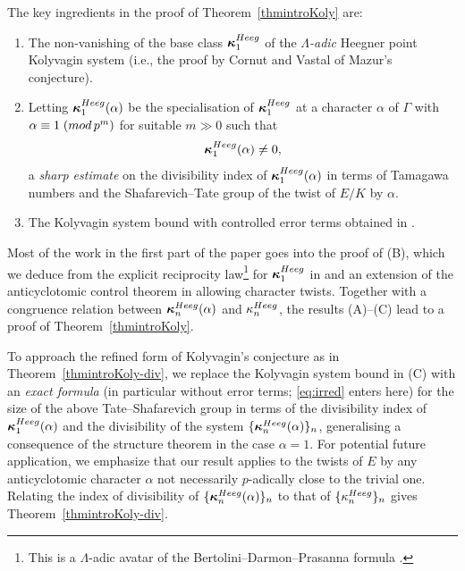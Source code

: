 \documentclass[10pt,reqno]{amsart}
\numberwithin{equation}{section}
\theoremstyle{plain}
\theoremstyle{definition}
\theoremstyle{definition}
\theoremstyle{plain}
\theoremstyle{plain}
\theoremstyle{plain}
\theoremstyle{plain}
\theoremstyle{plain}
\theoremstyle{plain}
\newcommand{\bkappa}{\boldsymbol{\kappa}}
\begin{document}
The key ingredients in the proof of Theorem~\ref{thmintroKoly} are:
\begin{enumerate}
\item[(A)] The non-vanishing of the base class $\bkappa_1^{\rm Heeg}$ of the \emph{$\Lambda$-adic} Heegner point Kolyvagin system (i.e., the proof by Cornut and Vastal of Mazur's conjecture). 
\item[(B)] Letting $\bkappa_1^{\rm Heeg}(\alpha)$ be the specialisation of $\bkappa_1^{\rm Heeg}$ at a character $\alpha$ of $\Gamma$ with $\alpha\equiv 1\;({\rm mod}\,p^m)$ for suitable $m\gg 0$ such that 
\begin{equation}\label{nv}
\bkappa_1^{\rm Heeg}(\alpha)\neq 0,
\end{equation} 
a \emph{sharp estimate} on the divisibility index of $\bkappa_1^{\rm Heeg}(\alpha)$ in terms of Tamagawa numbers and the Shafarevich--Tate group 
of the twist of $E/K$ by $\alpha$.
\item[(C)] The Kolyvagin system bound with controlled error terms obtained in \cite{eisenstein_cyc}.
\end{enumerate}

Most of the work in the first part of the paper goes into the proof of (B), which we deduce from the explicit reciprocity law\footnote{This is a $\Lambda$-adic avatar of the Bertolini--Darmon--Prasanna formula \cite{BDP}.}
for $\bkappa_1^{\rm Heeg}$ in \cite{cas-hsieh1} and an extension of the anticyclotomic control theorem in \cite{jsw} allowing character twists. Together with a congruence relation between $\bkappa_{n}^{\rm Heeg}(\alpha)$ and $\kappa_n^{\rm Heeg}$, 
the results (A)--(C) lead to a proof of Theorem~\ref{thmintroKoly}. 

To approach the refined form of Kolyvagin's conjecture as in Theorem~\ref{thmintroKoly-div}, we replace the Kolyvagin system bound in (C) with an \emph{exact formula} (in particular without error terms; \eqref{eq:irred} enters here) for the size of the above Tate--Shafarevich group in terms of the divisibility index of $\bkappa_1^{\rm Heeg}(\alpha)$ and the divisibility of the system $\{\bkappa_{n}^{\rm Heeg}(\alpha)\}_n$, generalising a consequence of
%
the structure theorem \cite[Thm.~1]{kolystructure} in the case $\alpha=1$. For potential future application, we emphasize that our result applies to the twists of $E$ by any anticyclotomic character $\alpha$ not necessarily $p$-adically close to the trivial one.
Relating the index of divisibility of $\{\bkappa_{n}^{\rm Heeg}(\alpha)\}_n$ to that of $\{\kappa_n^{\rm Heeg}\}_n$ gives Theorem~\ref{thmintroKoly-div}.
\end{document}
